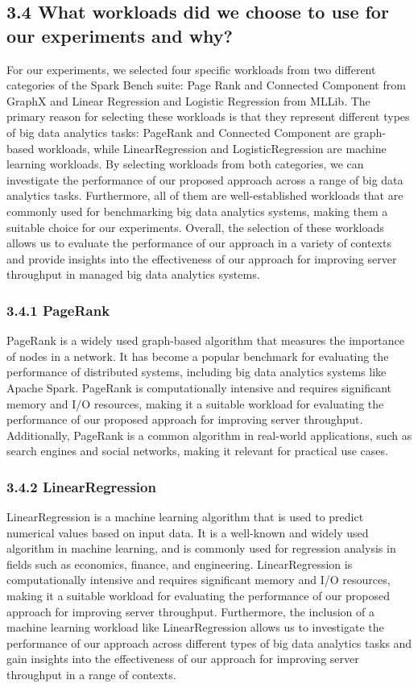 \documentclass[twocolumn,10pt]{asme2e}
\begin{document}
\subsection*{3.4 What workloads did we choose to use for our experiments and why?}
For our experiments, we selected four specific workloads from two different categories of the Spark Bench suite: Page Rank and Connected Component from GraphX and Linear Regression and Logistic Regression from MLLib. The primary reason for selecting these workloads is that they represent different types of big data analytics tasks: PageRank and Connected Component are graph-based workloads, while LinearRegression and LogisticRegression are machine learning workloads. By selecting workloads from both categories, we can investigate the performance of our proposed approach across a range of big data analytics tasks. Furthermore, all of them are well-established workloads that are commonly used for benchmarking big data analytics systems, making them a suitable choice for our experiments. Overall, the selection of these workloads allows us to evaluate the performance of our approach in a variety of contexts and provide insights into the effectiveness of our approach for improving server throughput in managed big data analytics systems.

\subsubsection*{3.4.1 PageRank}
PageRank is a widely used graph-based algorithm that measures the importance of nodes in a network. It has become a popular benchmark for evaluating the performance of distributed systems, including big data analytics systems like Apache Spark. PageRank is computationally intensive and requires significant memory and I/O resources, making it a suitable workload for evaluating the performance of our proposed approach for improving server throughput. Additionally, PageRank is a common algorithm in real-world applications, such as search engines and social networks, making it relevant for practical use cases.

\subsubsection*{3.4.2 LinearRegression}
LinearRegression is a machine learning algorithm that is used to predict numerical values based on input data. It is a well-known and widely used algorithm in machine learning, and is commonly used for regression analysis in fields such as economics, finance, and engineering. LinearRegression is computationally intensive and requires significant memory and I/O resources, making it a suitable workload for evaluating the performance of our proposed approach for improving server throughput. Furthermore, the inclusion of a machine learning workload like LinearRegression allows us to investigate the performance of our approach across different types of big data analytics tasks and gain insights into the effectiveness of our approach for improving server throughput in a range of contexts.
\end{document}
